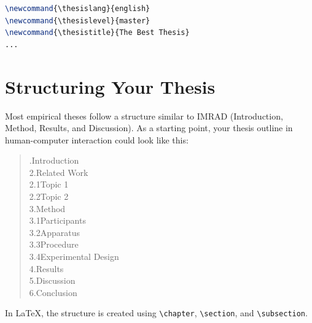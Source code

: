 \begin{lstlisting}[language=TeX,caption={Example configuration in config.tex}]
\newcommand{\thesislang}{english}
\newcommand{\thesislevel}{master}
\newcommand{\thesistitle}{The Best Thesis}
...
\end{lstlisting}


\section{Structuring Your Thesis}

Most empirical theses follow a structure similar to IMRAD (Introduction, Method, Results, and Discussion). As a starting point, your thesis outline in human-computer interaction could look like this:

\begin{quote}
.\quad Introduction\\
2.\quad Related Work\\
\hspace*{1.5em}2.1\quad Topic 1\\
\hspace*{1.5em}2.2\quad Topic 2\\
3.\quad Method\\
\hspace*{1.5em}3.1\quad Participants\\
\hspace*{1.5em}3.2\quad Apparatus\\
\hspace*{1.5em}3.3\quad Procedure\\
\hspace*{1.5em}3.4\quad Experimental Design\\
4.\quad Results\\
5.\quad Discussion\\
6.\quad Conclusion\\
\end{quote}

In \LaTeX, the structure is created using \texttt{\textbackslash chapter}, \texttt{\textbackslash section}, and \texttt{\textbackslash subsection}.

